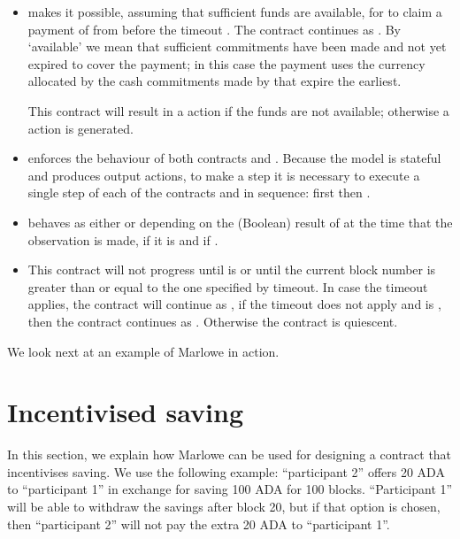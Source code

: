 \documentclass[
      acmsmall
    , screen
    , review=true
  ]{acmart}
\begin{document}
\begin{itemize}
\item {} makes it possible, assuming that sufficient funds are available, for 
 to claim  a payment of  from  before the timeout 
. The contract continues as . By `available' we mean that sufficient commitments have 
been made and  not yet expired to cover the payment; in this case the payment  uses the currency allocated by the cash 
commitments made by  that expire the earliest.

 This contract will result in a  action if the funds are not available; otherwise a  action is generated.

\item {} enforces the behaviour of both contracts  and . Because the model is stateful and produces output actions, to make a step it is necessary to execute a single step of each of  the contracts  and  in sequence: first  then .

\item {} behaves as either  or  depending on the (Boolean) result of  at the time that the observation is made,  if it is  and  if .

\item {} This contract will not progress until  is  or until the current block number is greater than or equal to the one specified by timeout. In case the timeout applies, the contract will continue as , if the timeout does not apply and  is , then the contract continues as . Otherwise the contract is quiescent.
\end{itemize}
We look next at an example of Marlowe in action.


\section{Incentivised saving}

In this section, we explain how Marlowe can be used for designing a contract that incentivises saving. We use the 
following example: ``participant 2'' offers 20 ADA to ``participant 1'' in exchange for saving 100 ADA for 100 blocks. 
``Participant 1'' will be able to withdraw the savings after block 20, but if that option is chosen, then ``participant 
2'' will not pay the extra 20 ADA to ``participant 1''.
\end{document}
